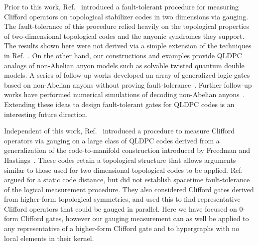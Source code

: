 \documentclass[11pt]{article}
\begin{document}
Prior to this work, Ref.~\cite{davydova2025universal} introduced a fault-tolerant procedure for measuring Clifford operators on topological stabilizer codes in two dimensions via gauging. The fault-tolerance of this procedure relied heavily on the topological properties of two-dimensional topological codes and the anyonic syndromes they support. The results shown here were not derived via a simple extension of the techniques in Ref.~\cite{davydova2025universal}. On the other hand, our constructions and examples provide QLDPC analogs of non-Abelian anyon models such as solvable twisted quantum double models. 
A series of follow-up works developed an array of generalized logic gates based on non-Abelian anyons without proving fault-tolerance~\cite{huang2025generatinglogicalmagicstates,sajith2025noncliffordgatesstabilizercodes}. Further follow-up works have performed numerical simulations of decoding non-Abelian anyons~\cite{delafuente2026highthresholddecodingnonpaulicodes,jing-intrinsic-heralding, jing2026integerlinearprogrammingdecoder}. Extending these ideas to design fault-tolerant gates for QLDPC codes is an interesting future direction. 

Independent of this work, Ref.~\cite{zhu2026nonabelianQLDPCtqftformalism} introduced a procedure to measure Clifford operators via gauging on a large class of QLDPC codes derived from a generalization of the code-to-manifold construction introduced by Freedman and Hastings~\cite{freedman2021buildingmanifoldsquantumcodes}. These codes retain a topological structure that allows arguments similar to those used for two dimensional topological codes to be applied. Ref.~\cite{zhu2026nonabelianQLDPCtqftformalism} argued for a static code distance, but did not establish spacetime fault-tolerance of the logical measurement procedure. They also considered Clifford gates derived from higher-form topological symmetries, and used this to find representative Clifford operators that could be gauged in parallel. Here we have focused on 0-form Clifford gates, however our gauging measurement can as well be applied to any representative of a higher-form Clifford gate and to hypergraphs with no local elements in their kernel. 
\end{document}
